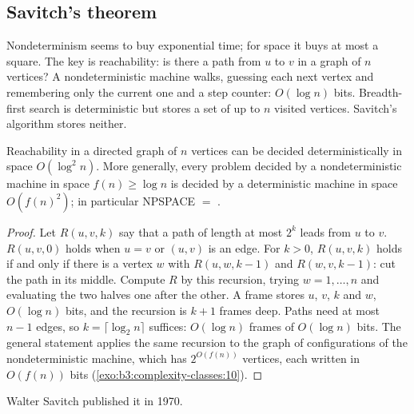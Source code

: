 \subsection{Savitch's theorem}

Nondeterminism seems to buy exponential time; for space it buys at most a square. The key is reachability: is there a path from $u$ to $v$ in a graph of $n$ vertices? A nondeterministic machine walks, guessing each next vertex and remembering only the current one and a step counter: $O(\log n)$ bits. Breadth-first search is deterministic but stores a set of up to $n$ visited vertices. Savitch's algorithm stores neither.

\begin{theorem}\label{thm:b3:complexity-classes:savitch}
Reachability in a directed graph of $n$ vertices can be decided deterministically in space $O(\log^2 n)$. More generally, every problem decided by a nondeterministic machine in space $f(n) \ge \log n$ is decided by a deterministic machine in space $O(f(n)^2)$; in particular NPSPACE $=$ .
\end{theorem}

\begin{proof}
Let $R(u, v, k)$ say that a path of length at most $2^k$ leads from $u$ to $v$. $R(u, v, 0)$ holds when $u = v$ or $(u, v)$ is an edge. For $k > 0$, $R(u, v, k)$ holds if and only if there is a vertex $w$ with $R(u, w, k - 1)$ and $R(w, v, k - 1)$: cut the path in its middle. Compute $R$ by this recursion, trying $w = 1, \ldots, n$ and evaluating the two halves one after the other. A frame stores $u$, $v$, $k$ and $w$, $O(\log n)$ bits, and the recursion is $k + 1$ frames deep. Paths need at most $n - 1$ edges, so $k = \lceil \log_2 n \rceil$ suffices: $O(\log n)$ frames of $O(\log n)$ bits. The general statement applies the same recursion to the graph of configurations of the nondeterministic machine, which has $2^{O(f(n))}$ vertices, each written in $O(f(n))$ bits (\cref{exo:b3:complexity-classes:10}).
\end{proof}

Walter Savitch published it in 1970. %

